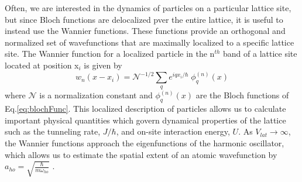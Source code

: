 Often, we are interested in the dynamics of particles on a particular lattice site, but since Bloch functions are delocalized pver the entire lattice, it is useful to instead use the Wannier functions. These functions provide an orthogonal and normalized set of wavefunctions that are maximally localized to a specific lattice site. The Wannier function for a localized particle in the n$^{th}$ band of a lattice site located at position x$_i$ is given by \cite{Jaksch2005}
	\begin{equation} \label{eq:wannier}
		 w_{n}(x - x_i) = \mathcal{N}^{-1/2} \sum_q e^{iqx_i/ \hbar} \; \phi_q^{(n)}(x)
	\end{equation}
where $\mathcal{N}$ is a normalization constant and $\phi_q^{(n)}(x)$ are the Bloch functions of Eq.\;\ref{eq:blochFunc}. This localized description of particles allows us to calculate important physical quantities which govern dynamical properties of the lattice such as the tunneling rate, $J/ \hbar$, and on-site interaction energy, $U$.  As $V_{lat}\!\rightarrow\!\infty$, the Wannier functions approach the eigenfunctions of the harmonic oscillator, which allows us to estimate the spatial extent of an atomic wavefunction by $a_{ho} = \sqrt{\frac{\hbar}{m \omega_{ho}}}$ \cite{Jaksch2005}. 

